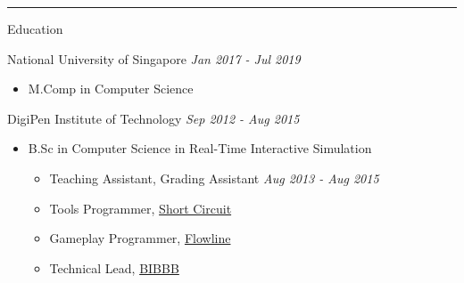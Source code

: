 \documentclass[letterpaper,11pt]{article}
\newcommand{\cvtitle}[1]{\huge\raggedright \textcolor{section_color}{#1}\\}
\newcommand{\cvhead}[1]{\large\raggedright \textcolor{subsection_color}{#1}\\}
\newcommand{\cvlist}[1]{\vspace{-12pt}\small \textcolor{item_color}{\begin{itemize}#1\end{itemize}}}
\newcommand{\cvli}[1]{\vspace{-4pt} \item{#1}}
\newcommand{\cvline}[0]{\noindent\rule{19cm}{0.4pt}}
\newcommand{\link}[2]{\textcolor{link_color}{\href{#1}{#2}}}
\newcommand{\qualifier}[1]{\hfill \textsl{\footnotesize #1}}
\begin{document}


\vspace{-12pt}

\cvline

\cvtitle{Education}
\cvhead{National University of Singapore \qualifier{Jan 2017 - Jul 2019}}
\cvlist{
    \cvli{
        \cvhead{M.Comp in Computer Science}
    }
}

\cvhead{DigiPen Institute of Technology \qualifier{Sep 2012 - Aug 2015}}
\cvlist{
    \cvli{
        \cvhead{B.Sc in Computer Science in Real-Time Interactive Simulation}
        \cvlist{
            \cvli{Teaching Assistant, Grading Assistant \qualifier{Aug 2013 - Aug 2015}}
            \cvli{Tools Programmer, \link{http://games.digipen.edu/games/shortcircuit}{Short Circuit}}
            \cvli{Gameplay Programmer, \link{http://games.digipen.edu/games/flowline}{Flowline}}
            \cvli{Technical Lead, \link{http://games.digipen.edu/games/bibbb}{BIBBB}}
        }
    }
}
\end{document}
